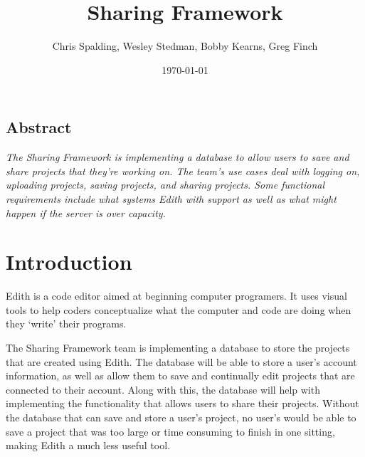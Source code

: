 \documentclass[12pt]{article}
\title{Sharing Framework}
\author{Chris Spalding, Wesley Stedman, Bobby Kearns, Greg Finch}
\date{\today}
\begin{document}
\maketitle

\subsection{Abstract}
\textit{The Sharing Framework is implementing a database to allow users to save and share projects that they're working on. The team's use cases deal with logging on, uploading projects, saving projects, and sharing projects. Some functional requirements include what systems Edith with support as well as what might happen if the server is over capacity.}

\section{Introduction}
Edith is a code editor aimed at beginning computer programers. It uses visual tools to help coders conceptualize what the computer and code are doing when they `write' their programs.

The Sharing Framework team is implementing a database to store the projects that are created using Edith. The database will be able to store a user's account information, as well as allow them to save and continually edit projects that are connected to their account. Along with this, the database will help with implementing the functionality that allows users to share their projects. Without the database that can save and store a user's project, no user's would be able to save a project that was too large or time consuming to finish in one sitting, making Edith a much less useful tool.
\newpage
\end{document}
